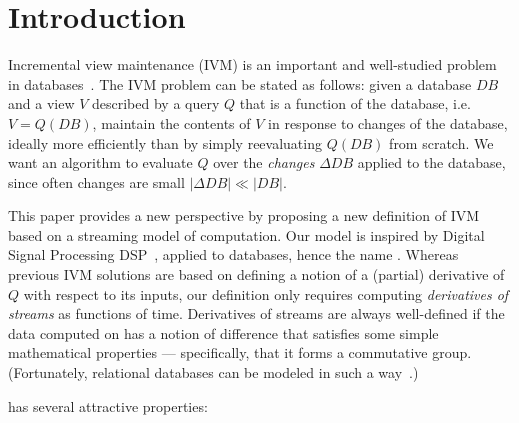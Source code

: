 \section{Introduction}\label{sec:introduction}

Incremental view maintenance (IVM) is an important and well-studied problem in
databases~\cite{gupta-idb95}.  The IVM problem can be stated as follows: given a database $DB$ and
a view $V$ described by a query $Q$ that is a function of the database, i.e. $V = Q(DB)$,
maintain the contents of $V$ in response to changes of the database,
ideally more efficiently than by simply reevaluating $Q(DB)$ from
scratch.  We want an algorithm to evaluate $Q$ over the \emph{changes} $\Delta DB$ applied
to the database, since often changes are small $|\Delta DB| \ll |DB|$.

This paper provides a new perspective by proposing a new definition
of IVM based on a streaming model of computation.  Our model is inspired by Digital Signal
Processing DSP~\cite{rabiner-book75}, applied to databases, hence the name \dbsp.  Whereas previous
IVM solutions are based on defining a notion of a (partial) derivative of $Q$ with respect to its inputs,
our definition only requires computing \emph{derivatives of streams} as functions of time.
Derivatives of streams are always well-defined if the data computed on has a notion of difference
that satisfies some simple mathematical properties --- specifically, that it forms a commutative
group.  (Fortunately, relational databases can be modeled
in such a way~\cite{green-pods07,koch-pods10}.)

\dbsp has several attractive properties:

